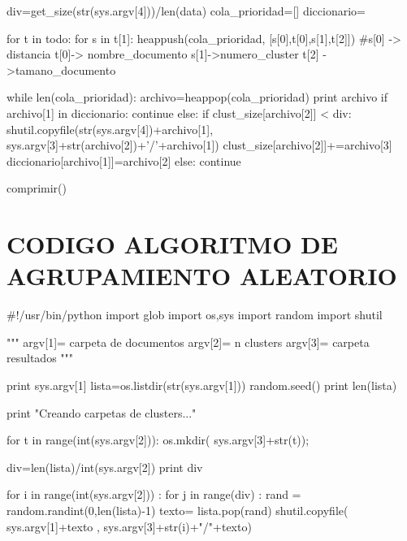 \begin{python}
	
	div=get_size(str(sys.argv[4]))/len(data)
	cola_prioridad=[]
	diccionario={}
	
	for t in todo:
		for s in t[1]:
			heappush(cola_prioridad, [s[0],t[0],s[1],t[2]])	
			#s[0] -> distancia	t[0]-> nombre_documento s[1]->numero_cluster t[2] ->tamano_documento
	
	while len(cola_prioridad):
		archivo=heappop(cola_prioridad)
		print archivo
		if archivo[1] in diccionario:
			continue
		else:
			if clust_size[archivo[2]] < div:
				shutil.copyfile(str(sys.argv[4])+archivo[1], sys.argv[3]+str(archivo[2])+'/'+archivo[1])
				clust_size[archivo[2]]+=archivo[3]
				diccionario[archivo[1]]=archivo[2]
			else:
				continue
			
	comprimir()	
	
	




\end{python}


\chapter{CODIGO ALGORITMO DE AGRUPAMIENTO ALEATORIO}
\label{ch:Codigo Metodo de agrupación random}

\begin{python}
#!/usr/bin/python
import glob
import os,sys
import random
import shutil

""" argv[1]= carpeta de documentos
	argv[2]= n clusters
	argv[3]= carpeta resultados
"""

print sys.argv[1]
lista=os.listdir(str(sys.argv[1]))
random.seed()
print len(lista)


print "Creando carpetas de clusters..."
	
for t in range(int(sys.argv[2])):
	os.mkdir( sys.argv[3]+str(t));

div=len(lista)/int(sys.argv[2])
print div



for i in range(int(sys.argv[2])) :
	for j in range(div) :	
		rand = random.randint(0,len(lista)-1)	
		texto= lista.pop(rand)	
		shutil.copyfile( sys.argv[1]+texto , sys.argv[3]+str(i)+"/"+texto)
		
		



\end{python}






